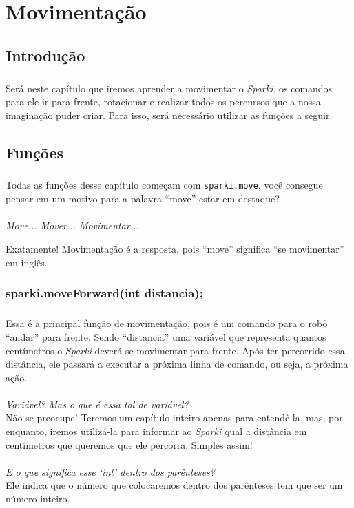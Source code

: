 \chapter{Movimentação}
\section*{Introdução}
    \paragraph{}
    Será neste capítulo que iremos aprender a movimentar o \textsl{Sparki}, os comandos para ele ir para frente, rotacionar e realizar todos os percursos que a nossa imaginação puder criar. Para isso, será necessário utilizar as funções a seguir.
    
\section{Funções}
    \paragraph{}
    Todas as funções desse capítulo começam com \texttt{sparki.move}, você consegue pensar em um motivo para a palavra ``move'' estar em destaque?
    \\~\\
    \textit{Move... Mover... Movimentar...}
    
    Exatamente! Movimentação é a resposta, pois ``move'' significa ``se movimentar'' em inglês.
    
\subsection{sparki.moveForward(int distancia);}
    \paragraph{}
    Essa é a principal função de movimentação, pois é um comando para o robô ``andar'' para frente. Sendo ``distancia'' uma variável que representa quantos centímetros o \textsl{Sparki} deverá se movimentar para frente. Após ter percorrido essa distância, ele passará a executar a próxima linha de comando, ou seja, a próxima ação.
    \\~\\
    \textit{Variável? Mas o que é essa tal de variável?} \\
    Não se preocupe! Teremos um capítulo inteiro apenas para entendê-la, mas, por enquanto, iremos utilizá-la para informar ao \textsl{Sparki} qual a distância em centímetros que queremos que ele percorra. Simples assim!
    \\~\\
    \textit{E o que significa esse `int' dentro dos parênteses?} \\
    Ele indica que o número que colocaremos dentro dos parênteses tem que ser um número inteiro.
    
